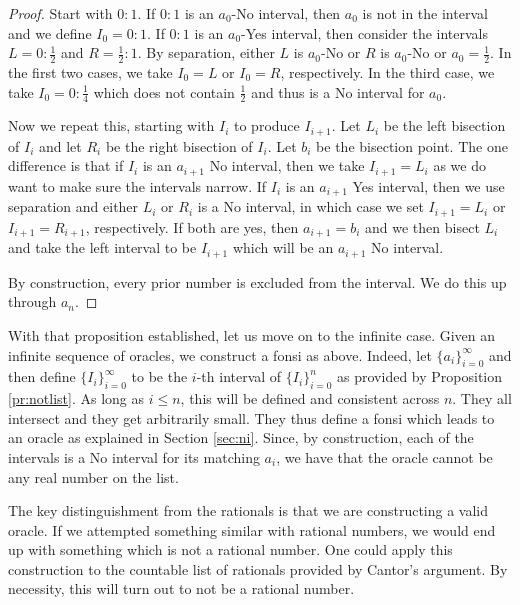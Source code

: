 \documentclass[12pt]{article}
\begin{document}
\begin{proof}
Start with $0:1$. If $0:1$ is an $a_0$-No interval, then $a_0$ is not in the interval and we define $I_0 = 0:1$. If $0:1$ is an $a_0$-Yes interval, then consider the intervals $L= 0:\tfrac{1}{2}$ and $R = \tfrac{1}{2}:1$. By separation, either $L$ is $a_0$-No or $R$ is $a_0$-No or $a_0 = \tfrac{1}{2}$. In the first two cases, we take $I_0=L$ or $I_0=R$, respectively. In the third case, we take $I_0 = 0:\tfrac{1}{4}$ which does not contain $\tfrac{1}{2}$ and thus is a No interval for $a_0$.

Now we repeat this, starting with $I_i$ to produce $I_{i+1}$. Let $L_i$ be the left bisection of $I_i$ and let $R_i$ be the right bisection of $I_i$. Let $b_i$ be the bisection point. The one difference is that if $I_i$ is an $a_{i+1}$ No interval, then we take $I_{i+1} = L_i$ as we do want to make sure the intervals narrow. If $I_i$ is an $a_{i+1}$ Yes interval, then we use separation and either $L_i$ or $R_i$ is a No interval, in which case we set $I_{i+1} = L_i $ or $I_{i+1} = R_{i+1}$, respectively. If both are yes, then $a_{i+1} = b_i$ and we then bisect $L_i$ and take the left interval to be $I_{i+1}$ which will be an $a_{i+1}$ No interval. 

By construction, every prior number is excluded from the interval. We do this up through $a_n$.
\end{proof} 

With that proposition established, let us move on to the infinite case. Given an infinite sequence of oracles, we construct a fonsi as above. Indeed, let $\{a_i\}_{i=0}^{\infty}$ and then define $\{I_i\}_{i=0}^{\infty}$ to be the $i$-th interval of $\{I_i\}_{i=0}^{n}$ as provided by Proposition \ref{pr:notlist}. As long as $i \leq n$, this will be defined and consistent across $n$. They all intersect and they get arbitrarily small. They thus define a fonsi which leads to an oracle as explained in Section \ref{sec:ni}. Since, by construction, each of the intervals is a No interval for its matching $a_i$, we have that the oracle cannot be any real number on the list. 

The key distinguishment from the rationals is that we are constructing a valid oracle. If we attempted something similar with rational numbers, we would end up with something which is not a rational number. One could apply this construction to the countable list of rationals provided by Cantor's argument. By necessity, this will turn out to not be a rational number. 
\end{document}
